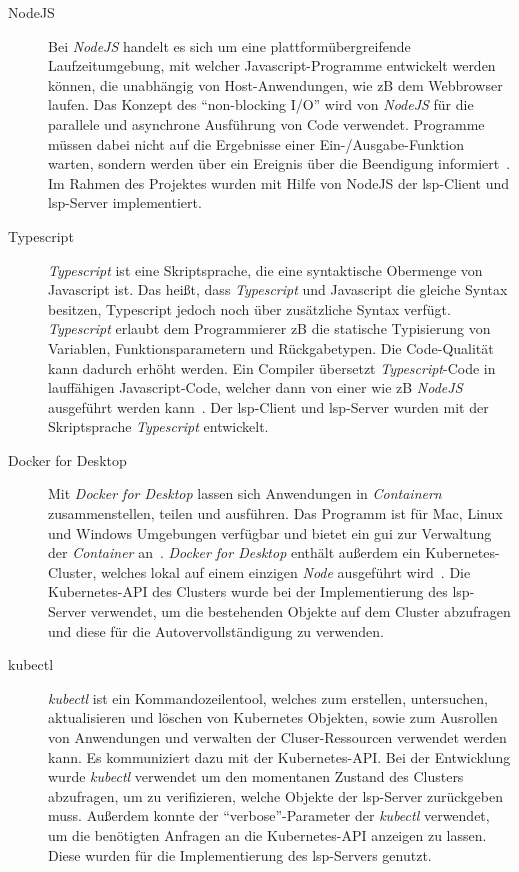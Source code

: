 \begin{description}
      \item[NodeJS]
            Bei \textit{NodeJS} handelt es sich um eine plattformübergreifende Laufzeitumgebung, mit welcher Javascript-Programme entwickelt werden können,
            die unabhängig von Host-Anwendungen, wie \ac{zB} dem Webbrowser laufen.
            Das Konzept des ``non-blocking I/O'' wird von \textit{NodeJS} für die parallele und asynchrone Ausführung von Code verwendet.
            Programme müssen dabei nicht auf die Ergebnisse einer Ein-/Ausgabe-Funktion warten,
            sondern werden über ein Ereignis über die Beendigung informiert~\cite{node-js-dev-insider,node-js-about}.
            Im Rahmen des Projektes wurden mit Hilfe von NodeJS der \ac{lsp}-Client und \ac{lsp}-Server implementiert.
      \item[Typescript]
            \textit{Typescript} ist eine Skriptsprache, die eine syntaktische Obermenge von Javascript ist. Das heißt, dass \textit{Typescript} und Javascript
            die gleiche Syntax besitzen, Typescript jedoch noch über zusätzliche Syntax verfügt.
            \textit{Typescript} erlaubt dem Programmierer \ac{zB} die statische Typisierung von Variablen, Funktionsparametern und Rückgabetypen.
            Die Code-Qualität kann dadurch erhöht werden. Ein Compiler übersetzt \textit{Typescript}-Code in lauffähigen Javascript-Code, welcher dann von einer
            wie \ac{zB} \textit{NodeJS} ausgeführt werden kann~\cite{typescript-kinsta,typescript-doubleslash-blog}.
            Der \ac{lsp}-Client und \ac{lsp}-Server wurden mit der Skriptsprache \textit{Typescript} entwickelt.
      \item[Docker for Desktop]
            Mit \textit{Docker for Desktop} lassen sich Anwendungen in \textit{Containern} zusammenstellen, teilen und ausführen.
            Das Programm ist für Mac, Linux und Windows Umgebungen verfügbar und bietet ein \ac{gui} zur Verwaltung der \textit{Container} an~\cite{docker-for-desktop-overview}.
            \textit{Docker for Desktop} enthält außerdem ein Kubernetes-Cluster, welches lokal auf einem einzigen \textit{Node} ausgeführt wird~\cite{docker-for-desktop-kubernetes}.
            Die Kubernetes-API des Clusters wurde bei der Implementierung des \ac{lsp}-Server verwendet, um
            die bestehenden Objekte auf dem Cluster abzufragen und diese für die Autovervollständigung zu verwenden.
      \item[kubectl]
            \textit{kubectl} ist ein Kommandozeilentool, welches zum erstellen, untersuchen, aktualisieren und löschen von Kubernetes Objekten, sowie zum Ausrollen
            von Anwendungen und verwalten der Cluser-Ressourcen verwendet werden kann. Es kommuniziert dazu mit der Kubernetes-API.\@
            Bei der Entwicklung wurde \textit{kubectl} verwendet um den momentanen Zustand des Clusters abzufragen,
            um zu verifizieren, welche Objekte der \ac{lsp}-Server zurückgeben muss.
            Außerdem konnte der ``verbose''-Parameter der \textit{kubectl} verwendet, um die benötigten Anfragen an die Kubernetes-API anzeigen zu lassen.
            Diese wurden für die Implementierung des \ac{lsp}-Servers genutzt.
\end{description}

